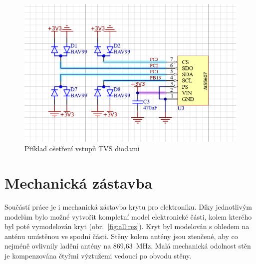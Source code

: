 \documentclass[twoside]{ctuthesis}
\theoremstyle{plain}
\theoremstyle{definition}
\theoremstyle{note}
\begin{document}
		\begin{figure}
			\centering
			\includegraphics[width = .55\textwidth]{Figures/osetreni_vstupu.png}
			\caption{Příklad ošetření vstupů TVS diodami}
			\label{fig:osetreni:vstupu}
		\end{figure}




	\section{Mechanická zástavba}
	Součástí práce je i mechanická zástavba krytu pro elektroniku. 
	Díky jednotlivým modelům bylo možné vytvořit kompletní model elektronické části, kolem kterého byl poté vymodelován kryt (obr.~\ref{fig:all:rez}). Kryt byl modelován s ohledem na anténu umístěnou ve spodní části. Stěny kolem antény jsou ztenčené, aby co nejméně ovlivnily ladění antény na 869{,}63~MHz. Malá mechanická odolnost stěn je kompenzována čtyřmi výztužemi vedoucí po obvodu stěny.
\end{document}
